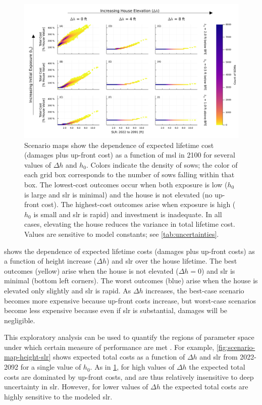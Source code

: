 \documentclass[11pt]{article}
\begin{document}
\begin{figure}
    \includegraphics[width=\textwidth]{scenario-map-slr-cost}
    \caption{
        Scenario maps show the dependence of expected lifetime cost (damages plus up-front cost) as a function of \gls{msl} in 2100 for several values of $\Delta h$ and $h_0$.
        Colors indicate the density of \glspl{sow}; the color of each grid box corresponds to the number of \glspl{sow} falling within that box.
        The lowest-cost outcomes occur when both exposure is low ($h_0$ is large and \gls{slr} is minimal) and the house is not elevated (no up-front cost).
        The highest-cost outcomes arise when exposure is high ($h_0$ is small and \gls{slr} is rapid) and investment is inadequate.
        In all cases, elevating the house reduces the variance in total lifetime cost.
        Values are sensitive to model constants; see \cref{tab:uncertainties}.
    }\label{fig:scenario-map-slr-cost}
\end{figure}

 shows the dependence of expected lifetime costs (damages plus up-front costs) as a function of height increase ($\Delta h$) and \gls{slr} over the house lifetime.
The best outcomes (yellow) arise when the house is not elevated ($\Delta h = 0$) and \gls{slr} is minimal (bottom left corners).
The worst outcomes (blue) arise when the house is elevated only slightly and \gls{slr} is rapid.
As $\Delta h$ increases, the best-case scenario becomes more expensive because up-front costs increase, but worst-case scenarios become less expensive because even if \gls{slr} is substantial, damages will be negligible.

This exploratory analysis can be used to quantify the regions of parameter space under which certain measure of performance are met \citep{herman:2015}.
For example, \cref{fig:scenario-map-height-slr} shows expected total costs as a function of $\Delta h$ and \gls{slr} from 2022-2092 for a single value of $h_0$.
As in \cref{fig:scenario-map-slr-cost}, for high values of $\Delta h$ the expected total costs are dominated by up-front costs, and are thus relatively insensitive to deep uncertainty in \gls{slr}.
However, for lower values of $\Delta h$ the expected total costs are highly sensitive to the modeled \gls{slr}.
\end{document}
